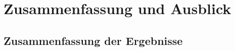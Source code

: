 \section{Zusammenfassung und Ausblick}\label{sec:zusammenfassung}
   \subsection{Zusammenfassung der Ergebnisse}\label{subsec:zusammenfassung}